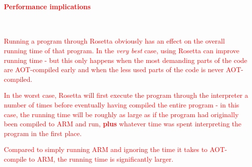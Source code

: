 \paragraph{\textcolor{red}{Performance implications}}~\smallskip

\textcolor{red}{Running a program through Rosetta obviously has an effect on the
overall running time of that program. In the \emph{very best} case, using Rosetta
can improve running time - but this only happens when the most demanding parts
of the code are AOT-compiled early and when the less used parts of the code is
never AOT-compiled.}

\smallskip

\textcolor{red}{In the worst case, Rosetta will first execute the program
through the interpreter a number of times before eventually having compiled the
entire program - in this case, the running time will be roughly as large as if
the program had originally been compiled to ARM and run, \textbf{plus} whatever
time was spent interpreting the program in the first place.}

\smallskip

\textcolor{red}{Compared to simply running ARM and ignoring the time it takes to
AOT-compile to ARM, the running time is significantly larger.}

\Sectend
